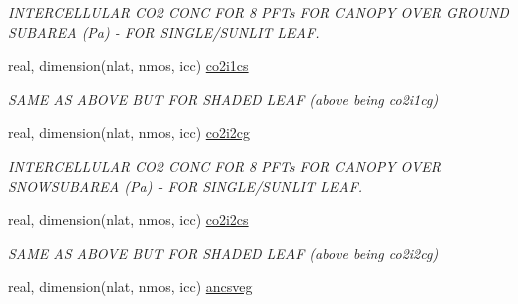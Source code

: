 \begin{DoxyCompactItemize}
\begin{DoxyCompactList}\small\item\em I\+N\+T\+E\+R\+C\+E\+L\+L\+U\+L\+A\+R C\+O2 C\+O\+N\+C F\+O\+R 8 P\+F\+Ts F\+O\+R C\+A\+N\+O\+P\+Y O\+V\+E\+R G\+R\+O\+U\+N\+D S\+U\+B\+A\+R\+E\+A (Pa) -\/ F\+O\+R S\+I\+N\+G\+L\+E/\+S\+U\+N\+L\+I\+T L\+E\+A\+F. \end{DoxyCompactList}\item 
\hypertarget{structctem__statevars_1_1veg__rot_adbef7bb217a1f18fc5c2f484a231c00a}{}real, dimension(nlat, nmos, icc) \hyperlink{structctem__statevars_1_1veg__rot_adbef7bb217a1f18fc5c2f484a231c00a}{co2i1cs}\label{structctem__statevars_1_1veg__rot_adbef7bb217a1f18fc5c2f484a231c00a}

\begin{DoxyCompactList}\small\item\em S\+A\+M\+E A\+S A\+B\+O\+V\+E B\+U\+T F\+O\+R S\+H\+A\+D\+E\+D L\+E\+A\+F (above being co2i1cg) \end{DoxyCompactList}\item 
\hypertarget{structctem__statevars_1_1veg__rot_a0eb24b1f197df08efd44751d689aea98}{}real, dimension(nlat, nmos, icc) \hyperlink{structctem__statevars_1_1veg__rot_a0eb24b1f197df08efd44751d689aea98}{co2i2cg}\label{structctem__statevars_1_1veg__rot_a0eb24b1f197df08efd44751d689aea98}

\begin{DoxyCompactList}\small\item\em I\+N\+T\+E\+R\+C\+E\+L\+L\+U\+L\+A\+R C\+O2 C\+O\+N\+C F\+O\+R 8 P\+F\+Ts F\+O\+R C\+A\+N\+O\+P\+Y O\+V\+E\+R S\+N\+O\+W\+S\+U\+B\+A\+R\+E\+A (Pa) -\/ F\+O\+R S\+I\+N\+G\+L\+E/\+S\+U\+N\+L\+I\+T L\+E\+A\+F. \end{DoxyCompactList}\item 
\hypertarget{structctem__statevars_1_1veg__rot_ad0387cdd50913a3ccb3926cebe4a77ec}{}real, dimension(nlat, nmos, icc) \hyperlink{structctem__statevars_1_1veg__rot_ad0387cdd50913a3ccb3926cebe4a77ec}{co2i2cs}\label{structctem__statevars_1_1veg__rot_ad0387cdd50913a3ccb3926cebe4a77ec}

\begin{DoxyCompactList}\small\item\em S\+A\+M\+E A\+S A\+B\+O\+V\+E B\+U\+T F\+O\+R S\+H\+A\+D\+E\+D L\+E\+A\+F (above being co2i2cg) \end{DoxyCompactList}\item 
\hypertarget{structctem__statevars_1_1veg__rot_a11bf96b95e7f1e6d001bf4701e056757}{}real, dimension(nlat, nmos, icc) \hyperlink{structctem__statevars_1_1veg__rot_a11bf96b95e7f1e6d001bf4701e056757}{ancsveg}\label{structctem__statevars_1_1veg__rot_a11bf96b95e7f1e6d001bf4701e056757}


\end{DoxyCompactItemize}
